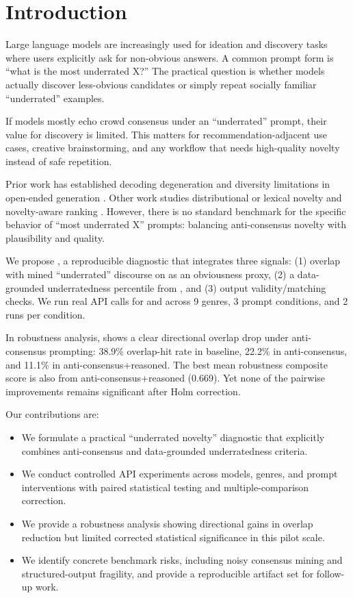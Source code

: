 \section{Introduction}
\label{sec:introduction}
Large language models are increasingly used for ideation and discovery tasks where users explicitly ask for non-obvious answers. A common prompt form is ``what is the most underrated X?'' The practical question is whether models actually discover less-obvious candidates or simply repeat socially familiar ``underrated'' examples.

 If models mostly echo crowd consensus under an ``underrated'' prompt, their value for discovery is limited. This matters for recommendation-adjacent use cases, creative brainstorming, and any workflow that needs high-quality novelty instead of safe repetition.

 Prior work has established decoding degeneration and diversity limitations in open-ended generation \citep{holtzman2019curious,vijayakumar2016diverse}. Other work studies distributional or lexical novelty \citep{pillutla2021mauve} and novelty-aware ranking \citep{sharma2024optimizing}. However, there is no standard benchmark for the specific behavior of ``most underrated X'' prompts: balancing anti-consensus novelty with plausibility and quality.

 We propose \benchmarkname, a reproducible diagnostic that integrates three signals: (1) overlap with mined ``underrated'' discourse on \reddit as an obviousness proxy, (2) a data-grounded underratedness percentile from \movielens, and (3) output validity/matching checks. We run real API calls for \gptfourone and \gptfive across 9 genres, 3 prompt conditions, and 2 runs per condition.

 In robustness analysis, \gptfourone shows a clear directional overlap drop under anti-consensus prompting: 38.9\% overlap-hit rate in baseline, 22.2\% in anti-consensus, and 11.1\% in anti-consensus+reasoned. The best mean robustness composite score is also from anti-consensus+reasoned (0.669). Yet none of the pairwise \uns improvements remains significant after Holm correction.

Our contributions are:
\begin{itemize}
    \item We formulate a practical ``underrated novelty'' diagnostic that explicitly combines anti-consensus and data-grounded underratedness criteria.
    \item We conduct controlled API experiments across models, genres, and prompt interventions with paired statistical testing and multiple-comparison correction.
    \item We provide a robustness analysis showing directional gains in overlap reduction but limited corrected statistical significance in this pilot scale.
    \item We identify concrete benchmark risks, including noisy consensus mining and structured-output fragility, and provide a reproducible artifact set for follow-up work.
\end{itemize}

